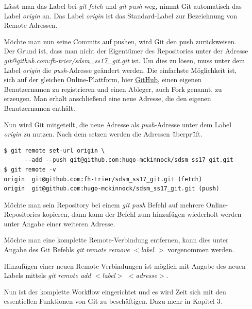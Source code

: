 \begin{INFO}
  Lässt man das Label bei \textit{git fetch} und \textit{git push} weg, nimmt Git automatisch das Label \textit{origin} an. Das Label \textit{origin} ist das Standard-Label zur Bezeichnung von Remote-Adressen.
\end{INFO}

Möchte man nun seine Commits auf pushen, wird Git den push zurückweisen. Der Grund ist, dass man nicht der Eigentümer des Repositories unter der Adresse \textit{git@github.com:fh-trier/sdsm\_ss17\_git.git} ist. Um dies zu lösen, muss unter dem Label \textit{origin} die \textit{push}-Adresse geändert werden. Die einfachste Möglichkeit ist, sich auf der gleichen Online-Plattform, hier \href{https://github.com}{GitHub}, einen eigenen Benutzernamen zu registrieren und einen Ableger, auch Fork genannt, zu erzeugen. Man erhält anschließend eine neue Adresse, die den eigenen Benutzernamen enthält. 

Nun wird Git mitgeteilt, die neue Adresse als \textit{push}-Adresse unter dem Label \textit{origin} zu nutzen. Nach dem setzen werden die Adressen überprüft.

\begin{verbatim}
$ git remote set-url origin \ 
      --add --push git@github.com:hugo-mckinnock/sdsm_ss17_git.git
$ git remote -v
origin	git@github.com:fh-trier/sdsm_ss17_git.git (fetch)
origin	git@github.com:hugo-mckinnock/sdsm_ss17_git.git (push)
\end{verbatim}

\begin{INFO}
  Möchte man sein Repository bei einem \textit{git push} Befehl auf mehrere Online-Repositories kopieren, dann kann der Befehl zum hinzufügen wiederholt werden unter Angabe einer weiteren Adresse.
\end{INFO}

Möchte man eine komplette Remote-Verbindung entfernen, kann dies unter Angabe des Git Befehls \textit{git remote remove  $ < $label $ > $} vorgenommen werden. 
  
Hinzufügen einer neuen Remote-Verbindungen ist möglich mit Angabe des neuen Labels mittels \textit{git remote add $ < $label$ > $ $ < $adresse$ > $}.

Nun ist der komplette Workflow eingerichtet und es wird Zeit sich mit den essentiellen Funktionen von Git zu beschäftigen. Dazu mehr in Kapitel 3.
